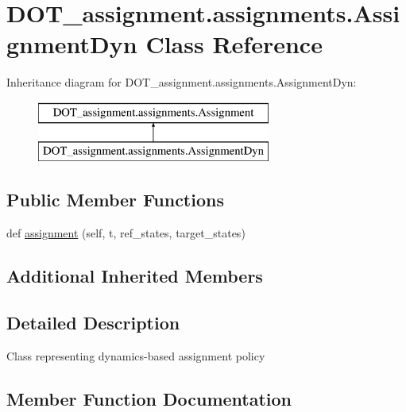 \hypertarget{class_d_o_t__assignment_1_1assignments_1_1_assignment_dyn}{}\section{D\+O\+T\+\_\+assignment.\+assignments.\+Assignment\+Dyn Class Reference}
\label{class_d_o_t__assignment_1_1assignments_1_1_assignment_dyn}
Inheritance diagram for D\+O\+T\+\_\+assignment.\+assignments.\+Assignment\+Dyn\+:\begin{figure}[H]
\begin{center}
\leavevmode
\includegraphics[height=2.000000cm]{class_d_o_t__assignment_1_1assignments_1_1_assignment_dyn}
\end{center}
\end{figure}
\subsection*{Public Member Functions}
\begin{DoxyCompactItemize}
\item 
def \mbox{\hyperlink{class_d_o_t__assignment_1_1assignments_1_1_assignment_dyn_a94b981f344570cba994c8f792d248c6c}{assignment}} (self, t, ref\+\_\+states, target\+\_\+states)
\end{DoxyCompactItemize}
\subsection*{Additional Inherited Members}


\subsection{Detailed Description}
\begin{DoxyVerb}Class representing dynamics-based assignment policy
\end{DoxyVerb}
 

\subsection{Member Function Documentation}
\mbox{\label{class_d_o_t__assignment_1_1assignments_1_1_assignment_dyn_a94b981f344570cba994c8f792d248c6c}} 
